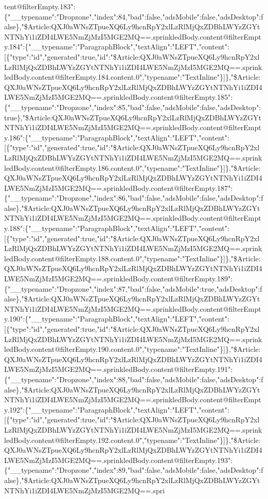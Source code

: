 tent@filterEmpty.183":\{"\_\_typename":"Dropzone","index":84,"bad":false,"adsMobile":false,"adsDesktop":false\},"\$Article:QXJ0aWNsZTpueXQ6Ly9hcnRpY2xlLzRlMjQxZDBhLWYzZGYtNTNhYi1iZDI4LWE5NmZjMzI5MGE2MQ==.sprinkledBody.content@filterEmpty.184":\{"\_\_typename":"ParagraphBlock","textAlign":"LEFT","content":{[}\{"type":"id","generated":true,"id":"\$Article:QXJ0aWNsZTpueXQ6Ly9hcnRpY2xlLzRlMjQxZDBhLWYzZGYtNTNhYi1iZDI4LWE5NmZjMzI5MGE2MQ==.sprinkledBody.content@filterEmpty.184.content.0","typename":"TextInline"\}{]}\},"\$Article:QXJ0aWNsZTpueXQ6Ly9hcnRpY2xlLzRlMjQxZDBhLWYzZGYtNTNhYi1iZDI4LWE5NmZjMzI5MGE2MQ==.sprinkledBody.content@filterEmpty.185":\{"\_\_typename":"Dropzone","index":85,"bad":false,"adsMobile":false,"adsDesktop":true\},"\$Article:QXJ0aWNsZTpueXQ6Ly9hcnRpY2xlLzRlMjQxZDBhLWYzZGYtNTNhYi1iZDI4LWE5NmZjMzI5MGE2MQ==.sprinkledBody.content@filterEmpty.186":\{"\_\_typename":"ParagraphBlock","textAlign":"LEFT","content":{[}\{"type":"id","generated":true,"id":"\$Article:QXJ0aWNsZTpueXQ6Ly9hcnRpY2xlLzRlMjQxZDBhLWYzZGYtNTNhYi1iZDI4LWE5NmZjMzI5MGE2MQ==.sprinkledBody.content@filterEmpty.186.content.0","typename":"TextInline"\}{]}\},"\$Article:QXJ0aWNsZTpueXQ6Ly9hcnRpY2xlLzRlMjQxZDBhLWYzZGYtNTNhYi1iZDI4LWE5NmZjMzI5MGE2MQ==.sprinkledBody.content@filterEmpty.187":\{"\_\_typename":"Dropzone","index":86,"bad":false,"adsMobile":false,"adsDesktop":false\},"\$Article:QXJ0aWNsZTpueXQ6Ly9hcnRpY2xlLzRlMjQxZDBhLWYzZGYtNTNhYi1iZDI4LWE5NmZjMzI5MGE2MQ==.sprinkledBody.content@filterEmpty.188":\{"\_\_typename":"ParagraphBlock","textAlign":"LEFT","content":{[}\{"type":"id","generated":true,"id":"\$Article:QXJ0aWNsZTpueXQ6Ly9hcnRpY2xlLzRlMjQxZDBhLWYzZGYtNTNhYi1iZDI4LWE5NmZjMzI5MGE2MQ==.sprinkledBody.content@filterEmpty.188.content.0","typename":"TextInline"\}{]}\},"\$Article:QXJ0aWNsZTpueXQ6Ly9hcnRpY2xlLzRlMjQxZDBhLWYzZGYtNTNhYi1iZDI4LWE5NmZjMzI5MGE2MQ==.sprinkledBody.content@filterEmpty.189":\{"\_\_typename":"Dropzone","index":87,"bad":false,"adsMobile":true,"adsDesktop":false\},"\$Article:QXJ0aWNsZTpueXQ6Ly9hcnRpY2xlLzRlMjQxZDBhLWYzZGYtNTNhYi1iZDI4LWE5NmZjMzI5MGE2MQ==.sprinkledBody.content@filterEmpty.190":\{"\_\_typename":"ParagraphBlock","textAlign":"LEFT","content":{[}\{"type":"id","generated":true,"id":"\$Article:QXJ0aWNsZTpueXQ6Ly9hcnRpY2xlLzRlMjQxZDBhLWYzZGYtNTNhYi1iZDI4LWE5NmZjMzI5MGE2MQ==.sprinkledBody.content@filterEmpty.190.content.0","typename":"TextInline"\}{]}\},"\$Article:QXJ0aWNsZTpueXQ6Ly9hcnRpY2xlLzRlMjQxZDBhLWYzZGYtNTNhYi1iZDI4LWE5NmZjMzI5MGE2MQ==.sprinkledBody.content@filterEmpty.191":\{"\_\_typename":"Dropzone","index":88,"bad":false,"adsMobile":false,"adsDesktop":false\},"\$Article:QXJ0aWNsZTpueXQ6Ly9hcnRpY2xlLzRlMjQxZDBhLWYzZGYtNTNhYi1iZDI4LWE5NmZjMzI5MGE2MQ==.sprinkledBody.content@filterEmpty.192":\{"\_\_typename":"ParagraphBlock","textAlign":"LEFT","content":{[}\{"type":"id","generated":true,"id":"\$Article:QXJ0aWNsZTpueXQ6Ly9hcnRpY2xlLzRlMjQxZDBhLWYzZGYtNTNhYi1iZDI4LWE5NmZjMzI5MGE2MQ==.sprinkledBody.content@filterEmpty.192.content.0","typename":"TextInline"\}{]}\},"\$Article:QXJ0aWNsZTpueXQ6Ly9hcnRpY2xlLzRlMjQxZDBhLWYzZGYtNTNhYi1iZDI4LWE5NmZjMzI5MGE2MQ==.sprinkledBody.content@filterEmpty.193":\{"\_\_typename":"Dropzone","index":89,"bad":false,"adsMobile":false,"adsDesktop":false\},"\$Article:QXJ0aWNsZTpueXQ6Ly9hcnRpY2xlLzRlMjQxZDBhLWYzZGYtNTNhYi1iZDI4LWE5NmZjMzI5MGE2MQ==.spri